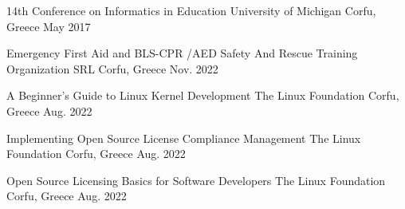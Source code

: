 \begin{cventries}
  \cventry
    {14th Conference on Informatics in Education} %
    {University of Michigan} %
    {Corfu, Greece} %
    {May 2017} %
    {
      \begin{cvitems} %
      \end{cvitems}
    }


  \cventry
    {Emergency First Aid and BLS-CPR /AED} %
    {Safety And Rescue Training Organization SRL} %
    {Corfu, Greece} %
    {Nov. 2022} %
    {
      \begin{cvitems} %
      \end{cvitems}
    }


  \cventry
    {A Beginner's Guide to Linux Kernel Development} %
    {The Linux Foundation} %
    {Corfu, Greece} %
    {Aug. 2022} %
    {
      \begin{cvitems} %
      \end{cvitems}
    }


  \cventry
    {Implementing Open Source License Compliance Management} %
    {The Linux Foundation} %
    {Corfu, Greece} %
    {Aug. 2022} %
    {
      \begin{cvitems} %
      \end{cvitems}
    }


  \cventry
    {Open Source Licensing Basics for Software Developers} %
    {The Linux Foundation} %
    {Corfu, Greece} %
    {Aug. 2022} %
    {
      \begin{cvitems} %
      \end{cvitems}
    }


\end{cventries}
